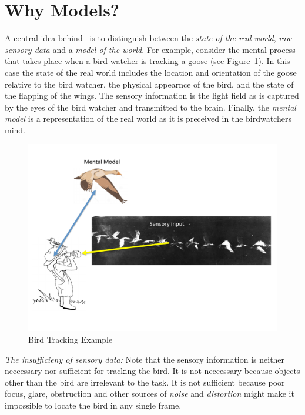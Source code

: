 \section{Why Models?}
\label{sec:model-abstract}

A central idea behind \projName\ is to distinguish between the {\em
  state of the real world}, {\em raw sensory data} and a {\em model of
  the world}. For example, consider the mental process that takes
place when a bird watcher is tracking a goose (see
Figure~\ref{fig:trackingGeese}). In this case the state of the real
world includes the location and orientation of the goose relative to
the bird watcher, the physical appearnce of the bird, and the state of
the flapping of the wings. The sensory information is the light field
as is captured by the eyes of the bird watcher and transmitted to the
brain. Finally, the {\em mental model} is a representation of the real
world as it is preceived in the birdwatchers mind.

\begin{figure}[t]
\center
\includegraphics[width=\columnwidth]{TrackingGeese.pdf}
\caption{Bird Tracking Example}
\label{fig:trackingGeese}
\vspace{-0.4cm}
\end{figure}

\emph{The insufficieny of sensory data:} Note that the sensory
information is neither neccessary nor sufficient for tracking the
bird. It is not neccessary because objects other than the bird are
irrelevant to the task. It is not sufficient because poor focus,
glare, obstruction and other sources of {\em noise} and {\em
  distortion} might make it impossible to locate the bird in any single
frame.

